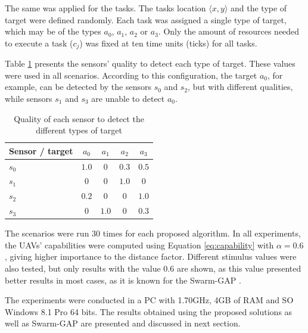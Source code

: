 The same was applied for the tasks. The tasks location $\langle x,y \rangle$ and the type of target were defined randomly. 
Each task was assigned a single type of target, which may be of the types $a_0$, $a_1$, $a_2$ or $a_3$.
Only the amount of resources needed to execute a task ($c_j$) was fixed at ten time units (ticks) for all tasks. 

Table \ref{table:quality} presents the sensors' quality to detect each type of target. These values were used in all scenarios. According to this configuration, the target $a_0$, for example, can be detected by the sensors $s_0$ and $s_2$, but with different qualities, while sensors $s_1$ and $s_3$ are unable to detect $a_0$.

\begin{table}[h!]
	\small
	\fontsize{8}{8}\selectfont
	\centering
	\caption{Quality of each sensor to detect the different types of target}
	\label{table:quality}
	\begin{tabular}{|l|c|c|c|c|} \hline
		Sensor / target  & $a_0$  & $a_1$  & $a_2$  & $a_3$    \\ \hline
		$s_0$              & $1.0$  & $0$  & $0.3$  & $0.5$      \\ \hline
		$s_1$              & $0$  & $0$  & $1.0$  & $0$           \\ \hline
		$s_2$              & $0.2$  & $0$  & $0$  & $1.0$        \\ \hline
		$s_3$              & $0$  & $1.0$  & $0$  & $0.3$        \\ \hline
	\end{tabular}
\end{table}


The scenarios were run 30 times for each proposed algorithm. 
In all experiments, the UAVs' capabilities were computed using Equation \ref{eq:capability} with $\alpha = 0.6$, giving higher importance to the distance factor.
Different stimulus values were also tested, but only results with the value 0.6 are shown, as this value presented better results in most cases, as it is known for the Swarm-GAP \citep{ferreira2010robocup}.

The experiments were conducted in a PC with 1.70GHz, 4GB of RAM and SO Windows 8.1 Pro 64 bits. 
The results obtained using the proposed solutions as well as Swarm-GAP are presented and discussed in next section.

